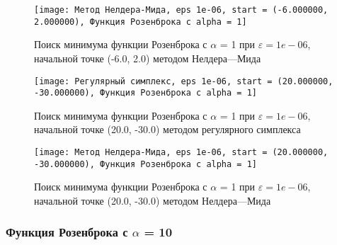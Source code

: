             \begin{figure}[H]
	        \centering
	        \texttt{[image: Метод Нелдера-Мида, eps 1e-06, start = (-6.000000, 2.000000), Функция Розенброка с alpha = 1]}%
	        \caption{Поиск минимума функции Розенброка с $\alpha$ = 1 при $\varepsilon = 1e-06$, начальной точке (-6.0, 2.0) методом Нелдера---Мида}
	        \vspace*{-1.2cm}
            \end{figure}
            
            \begin{figure}[H]
	        \centering
	        \texttt{[image: Регулярный симплекс, eps 1e-06, start = (20.000000, -30.000000), Функция Розенброка с alpha = 1]}%
	        \caption{Поиск минимума функции Розенброка с $\alpha$ = 1 при $\varepsilon = 1e-06$, начальной точке (20.0, -30.0) методом регулярного симплекса}
	        \vspace*{-1.2cm}
            \end{figure}
            
            \begin{figure}[H]
	        \centering
	        \texttt{[image: Метод Нелдера-Мида, eps 1e-06, start = (20.000000, -30.000000), Функция Розенброка с alpha = 1]}%
	        \caption{Поиск минимума функции Розенброка с $\alpha$ = 1 при $\varepsilon = 1e-06$, начальной точке (20.0, -30.0) методом Нелдера---Мида}
	        \vspace*{-1.2cm}
            \end{figure}
            \subsubsection{Функция Розенброка с $\alpha$ = 10}

